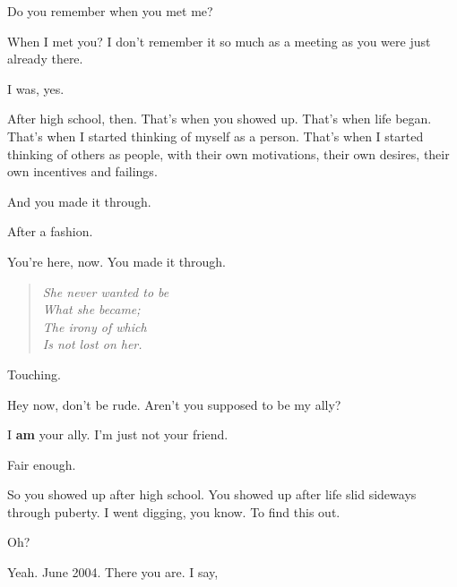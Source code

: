 \label{ally:3}
\begin{paracol}{2}
  \begin{leftcolumn}

\begin{ally}
Do you remember when you met me?
\end{ally}
When I met you? I don't remember it so much as a meeting as you were just already there.

\begin{ally}
I was, yes.
\end{ally}
After high school, then. That's when you showed up. That's when life began. That's when I started thinking of myself as a person. That's when I started thinking of others as people, with their own motivations, their own desires, their own incentives and failings.

\begin{ally}
And you made it through.
\end{ally}
After a fashion.

\begin{ally}
You're here, now. You made it through.
\end{ally}
\begin{verse}
\emph{She never wanted to be\\
\vin What she became;\\
\vin \vin The irony of which\\
\vin \vin \vin Is not lost on her.}
\end{verse}

\begin{ally}
Touching.
\end{ally}
Hey now, don't be rude. Aren't you supposed to be my ally?

\begin{ally}
I \textbf{am} your ally. I'm just not your friend.
\end{ally}
Fair enough.

So you showed up after high school. You showed up after life slid sideways through puberty. I went digging, you know. To find this out.

\begin{ally}
Oh?
\end{ally}
Yeah. June 2004. There you are. I say,


\end{leftcolumn}
\end{paracol}
